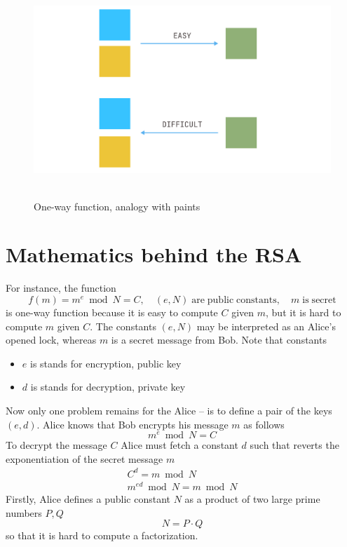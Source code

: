\documentclass[12pt,letterpaper,oneside,reqno]{amsart}
\begin{document}
    \begin{figure}[H]
        \centering
        \includegraphics[width=1\textwidth]{One_Way_Functions}
        ~\caption{One-way function, analogy with paints}\label{fig:figure3}
    \end{figure}


    \section{Mathematics behind the RSA}\label{sec:mathematics-behind-rsa}
    For instance, the function
    \begin{equation*}
        f(m) = m^e \bmod N = C, \quad (e, N) \mathrm{\; are \; public \; constants}, \quad m \; \mathrm{is \; secret}
    \end{equation*}
    is one-way function because it is easy to compute $C$ given $m$, but it is hard to compute $m$ given $C$.
    The constants $(e, N)$ may be interpreted as an Alice's opened lock, whereas $m$ is a secret message from Bob.
    Note that constants
    \begin{itemize}
        \item $e$ is stands for encryption, public key
        \item $d$ is stands for decryption, private key
    \end{itemize}
    Now only one problem remains for the Alice -- is to define a pair of the keys $(e, d)$.
    Alice knows that Bob encrypts his message $m$ as follows
    \[
        m^e \bmod N = C
    \]
    To decrypt the message $C$ Alice must fetch a constant $d$ such that reverts the exponentiation of the
    secret message $m$
    \begin{eqnarray*}
        C^d = m \bmod N \\
        m^{ed} \bmod N = m \bmod N
    \end{eqnarray*}
    Firstly, Alice defines a public constant $N$ as a product of two large prime numbers $P, Q$
    \[
        N = P \cdot Q
    \]
    so that it is hard to compute a factorization.
\end{document}
